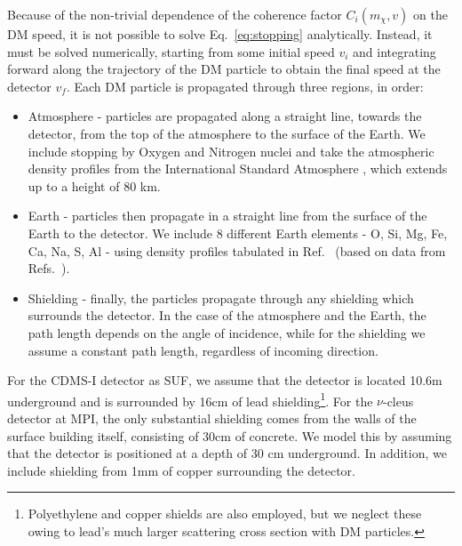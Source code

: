 \documentclass[prd,twocolumn,showpacs,nofootinbib,aps]{revtex4-1}
\begin{document}
Because of the non-trivial dependence of the coherence factor $C_i(m_\chi, v)$ on the DM speed, it is not possible to solve Eq.~\eqref{eq:stopping} analytically. Instead, it must be solved numerically, starting from some initial speed $v_i$ and integrating forward along the trajectory of the DM particle to obtain the final speed at the detector $v_f$. Each DM particle is propagated through three regions, in order:
\begin{itemize}
\item Atmosphere - particles are propagated along a straight line, towards the detector, from the top of the atmosphere to the surface of the Earth. We include stopping by Oxygen and Nitrogen nuclei and take the atmospheric density profiles from the International Standard Atmosphere \cite{ISA}, which extends up to a height of 80 km.
\item Earth - particles then propagate in a straight line from the surface of the Earth to the detector. We include 8 different Earth elements - O, Si, Mg, Fe, Ca, Na, S, Al - using density profiles tabulated in Ref.~\cite{Lundberg:2004dn} (based on data from Refs.~\cite{Geochemistry,Britannica}).
\item Shielding - finally, the particles propagate through any shielding which surrounds the detector. In the case of the atmosphere and the Earth, the path length depends on the angle of incidence, while for the shielding we assume a constant path length, regardless of incoming direction. 
\end{itemize}

For the CDMS-I detector as SUF, we assume that the detector is located 10.6m underground and is surrounded by 16cm of lead shielding\footnote{Polyethylene and copper shields are also employed, but we neglect these owing to lead's much larger scattering cross section with DM particles.}. For the $\nu$-cleus detector at MPI, the only substantial shielding comes from the walls of the surface building itself, consisting of 30cm of concrete. We model this by assuming that the detector is positioned at a depth of 30 cm underground. In addition, we include shielding from 1mm of copper surrounding the detector.
\end{document}
